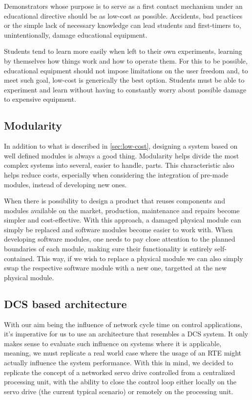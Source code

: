Demonstrators whose purpose is to serve as a first contact mechanism under an educational directive should be as low-cost as possible.
Accidents, bad practices or the simple lack of necessary knowledge can lead students and first-timers to, unintentionally, damage educational equipment.

Students tend to learn more easily when left to their own experiments, learning by themselves how things work and how to operate them. %
For this to be possible, educational equipment should not impose limitations on the user freedom and, to meet such goal, low-cost is generically the best option.
Students must be able to experiment and learn without having to constantly worry about possible damage to expensive equipment.

\subsection{Modularity}

In addition to what is described in \autoref{sec:low-cost}, designing a system based on well defined modules is always a good thing.
Modularity helps divide the most complex systems into several, easier to handle, parts.
This characteristic also helps reduce costs, especially when considering the integration of pre-made modules, instead of developing new ones.

When there is possibility to design a product that reuses components and modules available on the market, production, maintenance and repairs become simpler and cost-effective.
With this approach, a damaged physical module can simply be replaced and software modules become easier to work with.
When developing software modules, one needs to pay close attention to the planned boundaries of each module, making sure their functionality is entirely self-contained.
This way, if we wish to replace a physical module we can also simply swap the respective software module with a new one, targetted at the new physical module.

\subsection{DCS based architecture}

With our aim being the influence of network cycle time on control applications, it's imperative for us to use an architecture that resembles a DCS system.
It only makes sense to evaluate such influence on systems where it is applicable, meaning, we must replicate a real world case where the usage of an RTE might actually influence the system performance.
With this in mind, we decided to replicate the concept of a networked servo drive controlled from a centralized processing unit, with the ability to close the control loop either locally on the servo drive (the current typical scenario) or remotely on the processing unit.

